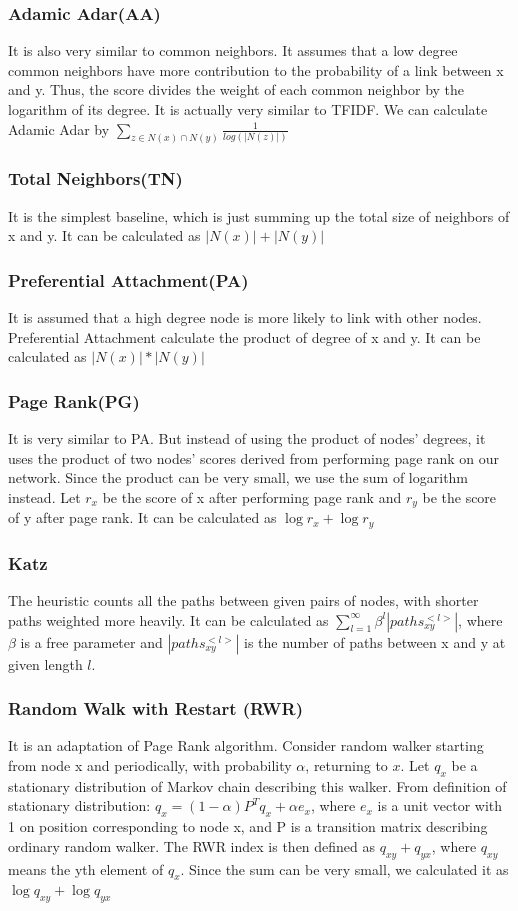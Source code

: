 \documentclass[12pt]{article}
\begin{document}
\subsubsection{Adamic Adar(AA)}
It is also very similar to common neighbors. It assumes that a low degree common neighbors have more contribution to the probability of a link between x and y. Thus, the score divides the weight of each common neighbor by the logarithm of its degree. It is actually very similar to TFIDF. We can calculate Adamic Adar by $\sum_{z \in N(x) \cap N(y)}{\frac{1}{log(|N(z)|)}}$
\subsubsection{Total Neighbors(TN)}
It is the simplest baseline, which is just summing up the total size of neighbors of x and y. It can be calculated as $|N(x)| + |N(y)|$
\subsubsection{Preferential Attachment(PA)}
It is assumed that a high degree node is more likely to link with other nodes. Preferential Attachment calculate the product of degree of x and y. It can be calculated as $|N(x)| * |N(y)|$
\subsubsection{Page Rank(PG)}
It is very similar to PA. But instead of using the product of nodes' degrees, it uses the product of two nodes' scores derived from performing page rank on our network. Since the product can be very small, we use the sum of logarithm instead. Let $r_x$ be the score of x after performing page rank and $r_y$ be the score of y after page rank. It can be calculated as $\log{r_x} + \log{r_y}$
\subsubsection{Katz}
The heuristic counts all the paths between given pairs of nodes, with shorter paths weighted more heavily. It can be calculated as $\sum_{l=1}^{\infty}\beta^l|paths_{xy}^{<l>}|$, where $\beta$ is a free parameter and $|paths_{xy}^{<l>}|$ is the number of paths between x and y at given length $l$. 
\subsubsection{Random Walk with Restart (RWR)}
It is an adaptation of Page Rank algorithm. Consider random walker starting from node x and periodically, with probability $\alpha$, returning to $x$. Let $q_{x}$ be a stationary distribution of Markov chain describing this walker. From definition of stationary distribution: $q_{x} = (1-\alpha)P^Tq_{x} + \alpha e_{x}$, where $e_{x}$ is a unit vector with 1 on position corresponding to node x, and P is a transition matrix describing ordinary random walker. The RWR index is then defined as $q_{xy} + q_{yx}$, where $q_{xy}$ means the yth element of $q_{x}$. Since the sum can be very small, we calculated it as $\log {q_{xy}} + \log {q_{yx}}$
\end{document}

